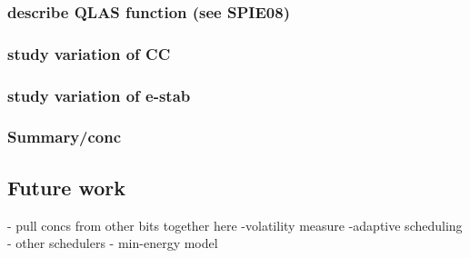 \subsubsection{describe QLAS function (see SPIE08)}
\subsubsection{study variation of CC}
\subsubsection{study variation of e-stab}
\subsubsection{Summary/conc}

\subsection{Future work} 
- pull concs from other bits together here
-volatility measure
-adaptive scheduling
- other schedulers - min-energy model
